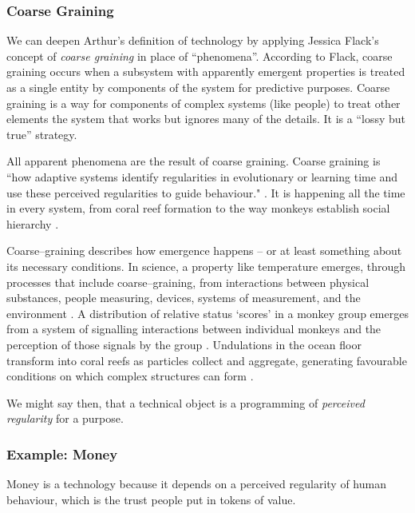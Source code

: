 \documentclass[letter:wpaper]{article}
\begin{document}
    \subsubsection{Coarse Graining}
    
    We can deepen Arthur's definition of technology by applying Jessica Flack's concept of \emph{coarse graining} in place of “phenomena”. According to Flack, coarse graining occurs when a subsystem with apparently emergent properties is treated as a single entity by components of the system for predictive purposes. Coarse graining is a way for components of complex systems (like people) to treat other elements the system that works but ignores many of the details. It is a “lossy but true” \citep[p.4]{FlackCrsGrnng2017} strategy.
    
    All apparent phenomena are the result of coarse graining. Coarse graining is “how adaptive systems identify regularities in evolutionary or learning time and use these perceived regularities to guide behaviour." \citep[p.2]{FlackCrsGrnng2017}. It is happening all the time in every system, from coral reef formation \citep[p.61]{FlackEtAlTmsclsSymmtryUncrtnty2013} to the way monkeys establish social hierarchy \citep{FlackCntxtMdltsSgnlMnng2007}.

    Coarse–graining describes how emergence happens – or at least something about its necessary conditions. In science, a property like temperature emerges, through processes that include coarse–graining, from interactions between physical substances, people measuring, devices, systems of measurement, and the environment \citep[p.4]{FlackCrsGrnng2017}. A distribution of relative status ‘scores’ in a monkey group emerges from a system of signalling interactions between individual monkeys and the perception of those signals by the group \citep{FlackCntxtMdltsSgnlMnng2007}. Undulations in the ocean floor transform into coral reefs as particles collect and aggregate, generating favourable conditions on which complex structures can form \citep[p.61]{FlackEtAlTmsclsSymmtryUncrtnty2013}.
    
    We might say then, that a technical object is a programming of \emph{perceived regularity} for a purpose.

    \subsubsection{Example: Money}

    Money is a technology because it depends on a perceived regularity of human behaviour, which is the trust people put in tokens of value.
\end{document}
